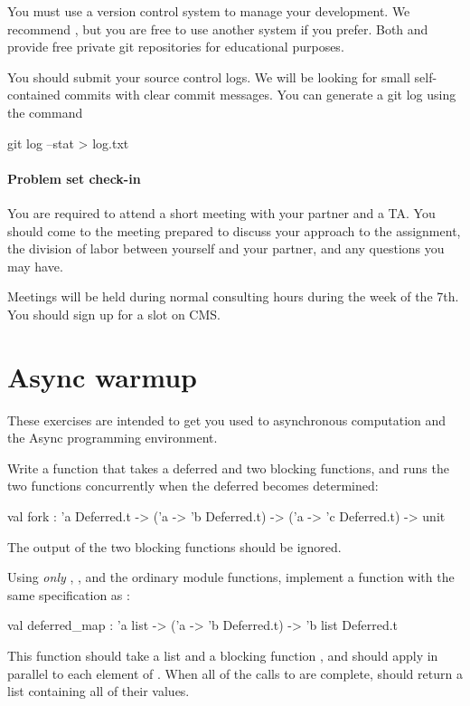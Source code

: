 \documentclass{pset}
\begin{document}
You must use a version control system to manage your development.  We
recommend , but you are free to use another system if you prefer.
Both  and
 provide free private git repositories
for educational purposes.

You should submit your source control logs.  We will be looking for small
self-contained commits with clear commit messages.  You can generate a git log
using the command
\begin{ocaml}
git log --stat > log.txt
\end{ocaml}

\subsection*{Problem set check-in}

You are required to attend a short meeting with your partner and a TA.  You
should come to the meeting prepared to discuss your approach to the assignment,
the division of labor between yourself and your partner, and any questions you
may have.

Meetings will be held during normal consulting hours during the week of the
7th.  You should sign up for a slot on CMS.

\newpage{}

\part{Async warmup}
\label{part:warmup}
These exercises are intended to get you used to asynchronous computation and
the Async programming environment.

\exercise{}

Write  a function  that takes a deferred and two blocking functions,
and runs the two functions concurrently when the deferred becomes determined:

\begin{ocaml}
val fork : 'a Deferred.t -> ('a -> 'b Deferred.t)
                         -> ('a -> 'c Deferred.t) -> unit
\end{ocaml}

The output of the two blocking functions should be ignored.

\exercise{}
Using \emph{only} \code{(>>=)}, , and the ordinary 
module functions, implement a function with the same specification as
:
\begin{ocaml}
val deferred_map : 'a list -> ('a -> 'b Deferred.t) -> 'b list Deferred.t
\end{ocaml}
This function should take a list  and a blocking function , and
should apply  in parallel to each element of .  When all of the
calls to  are complete,  should return a list
containing all of their values.
\end{document}
